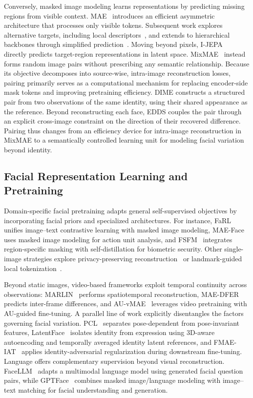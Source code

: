 \documentclass[10pt,journal,compsoc]{IEEEtran}
\begin{document}
Conversely, masked image modeling learns representations by predicting missing regions from visible context. MAE~\cite{he2022masked} introduces an efficient asymmetric architecture that processes only visible tokens. Subsequent work explores alternative targets, including local descriptors~\cite{wei2022masked}, and extends to hierarchical backbones through simplified prediction~\cite{xie2022simmim}. Moving beyond pixels, I-JEPA~\cite{assran2023self} directly predicts target-region representations in latent space. MixMAE~\cite{liu2023mixmae} instead forms random image pairs without prescribing any semantic relationship. Because its objective decomposes into source-wise, intra-image reconstruction losses, pairing primarily serves as a computational mechanism for replacing encoder-side mask tokens and improving pretraining efficiency. DIME constructs a structured pair from two observations of the same identity, using their shared appearance as the reference. Beyond reconstructing each face, EDDS couples the pair through an explicit cross-image constraint on the direction of their recovered difference. Pairing thus changes from an efficiency device for intra-image reconstruction in MixMAE to a semantically controlled learning unit for modeling facial variation beyond identity.

\subsection{Facial Representation Learning and Pretraining}
\label{sec:related_face}

Domain-specific facial pretraining adapts general self-supervised objectives by incorporating facial priors and specialized architectures. For instance, FaRL~\cite{zheng2022general} unifies image--text contrastive learning with masked image modeling, MAE-Face~\cite{ma2024facial} uses masked image modeling for action unit analysis, and FSFM~\cite{wang2025fsfm} integrates region-specific masking with self-distillation for biometric security. Other single-image strategies explore privacy-preserving reconstruction~\cite{wang2022facemae} or landmark-guided local tokenization~\cite{sun2024lafs}.

Beyond static images, video-based frameworks exploit temporal continuity across observations: MARLIN~\cite{cai2023marlin} performs spatiotemporal reconstruction, MAE-DFER~\cite{sun2023mae} predicts inter-frame differences, and AU-vMAE~\cite{jin2024vmae} leverages video pretraining with AU-guided fine-tuning. A parallel line of work explicitly disentangles the factors governing facial variation. PCL~\cite{liu2023pose} separates pose-dependent from pose-invariant features, LatentFace~\cite{he2023generative} isolates identity from expression using 3D-aware autoencoding and temporally averaged identity latent references, and FMAE-IAT~\cite{ning2024representation} applies identity-adversarial regularization during downstream fine-tuning. Language offers complementary supervision beyond visual reconstruction. FaceLLM~\cite{shahreza2025facellm} adapts a multimodal language model using generated facial question pairs, while GPTFace~\cite{li2025gptface} combines masked image/language modeling with image--text matching for facial understanding and generation.
\end{document}
